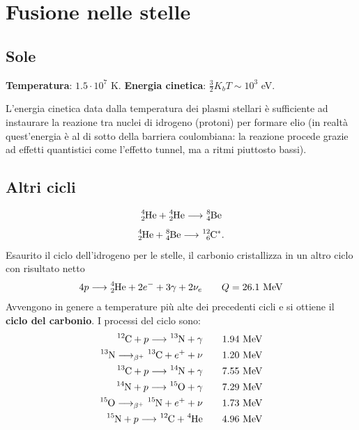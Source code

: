 \documentclass[a4paper,11pt,twoside,openany]{book}
\theoremstyle{definition}
\theoremstyle{plain}
\theoremstyle{plain}
\theoremstyle{definition}
\begin{document}
\section{Fusione nelle stelle} %
\subsection{Sole} %
\textbf{Temperatura}: $1.5\cdot 10^{7}$ K. \textbf{Energia cinetica}: $\frac{3}{2}K_bT\sim 10^3$ eV.

L'energia cinetica data dalla temperatura dei plasmi stellari è sufficiente ad instaurare la reazione tra nuclei di idrogeno (protoni) per formare elio (in realtà quest'energia è al di sotto della barriera coulombiana: la reazione procede grazie ad effetti quantistici come l'effetto tunnel, ma a ritmi piuttosto bassi).

\subsection{Altri cicli} %
$$\ce{^4_2He}+\ce{^4_2He}\longrightarrow \ce{^8_4Be}$$ $$\ce{^4_2He}+\ce{^8_4Be}\longrightarrow \ce{^{12}_6C}^*.$$ Esaurito il ciclo dell'idrogeno per le stelle, il carbonio cristallizza in un altro ciclo con risultato netto
\begin{equation}\begin{split}
4p\longrightarrow \ce{^4_2He}+2e^-+3\gamma+2\nu_e \qquad Q=26.1\textrm{ MeV}
\end{split}\end{equation}
Avvengono in genere a temperature più alte dei precedenti cicli e si ottiene il \textbf{ciclo del carbonio}. I processi del ciclo sono:
\begin{equation}\begin{split}
\ce{^{12}C}+p\longrightarrow \ce{^{13}N}+\gamma \qquad 1.94\textrm{ MeV} \\
\ce{^{13}N}\longrightarrow_{\beta^+} \ce{^{13}C}+e^++\nu \qquad 1.20\textrm{ MeV} \\
\ce{^{13}C}+p\longrightarrow \ce{^{14}N}+\gamma \qquad 7.55\textrm{ MeV} \\
\ce{^{14}N}+p\longrightarrow \ce{^{15}O}+\gamma \qquad 7.29\textrm{ MeV} \\
\ce{^{15}O}\longrightarrow_{\beta^+} \ce{^{15}N}+e^++\nu \qquad 1.73\textrm{ MeV} \\
\ce{^{15}N}+p\longrightarrow \ce{^{12}C}+\ce{^4He} \qquad 4.96\textrm{ MeV}
\end{split}\end{equation}
\end{document}
